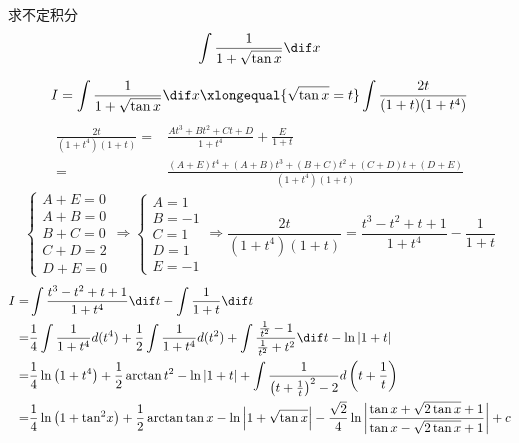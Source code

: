 \documentclass[color=green,titlestyle=hang]{elegantbook}%
\begin{document}
\begin{exercise}求不定积分\[\int {\frac{1}{{1 + \sqrt {\tan x} }}} \dif x\]
\end{exercise}\begin{Solution}
\[ I = \int {\frac{1}{{1 + \sqrt {\tan x} }}} \dif x\xlongequal{\sqrt {\tan x}  = t}\int\frac{2t}{(1+t)(1+t^4)}\]
\begin{align*}
\frac{{2t}}{{\left( {1 + {t^4}} \right)\left( {1 + t} \right)}}
=& \frac{{A{t^3} + B{t^2} + Ct + D}}{{1 + {t^4}}} + \frac{E}{{1 + t}} \\
=& \frac{{\left( {A + E} \right){t^4} + \left( {A + B} \right){t^3} + \left( {B + C} \right){t^2} + \left( {C + D} \right)t + \left( {D + E} \right)}}{{\left( {1 + {t^4}} \right)\left( {1 + t} \right)}}\end{align*}
\[\begin{cases}
A + E = 0\\A + B = 0\\B + C = 0\\C + D = 2\\D + E = 0
\end{cases}  \Longrightarrow \begin{cases}
A = 1\\B =  - 1\\C = 1\\D = 1\\E =  - 1
\end{cases} \Longrightarrow \frac{{2t}}{{\left( {1 + {t^4}} \right)\left( {1 + t} \right)}} = \frac{{{t^3} - {t^2} + t + 1}}{{1 + {t^4}}} - \frac{1}{{1 + t}}\]
\begin{align*}
I = &\int {\frac{{{t^3} - {t^2} + t + 1}}{{1 + {t^4}}}} \dif t - \int {\frac{1}{{1 + t}}} \dif t \\
= &\frac{1}{4}\int {\frac{1}{{1 + {t^4}}}} d({t^4}) + \frac{1}{2}\int {\frac{1}{{1 + {t^4}}}} d(t^2) + \int {\frac{{\frac{1}{{{t^2}}} - 1}}{{\frac{1}{{{t^2}}} + {t^2}}}\dif t}  - \ln \left| {1 + t} \right|\\
=& \frac{1}{4}\ln \left( {1 + {t^4}} \right) + \frac{1}{2}\arctan {t^2} - \ln \left| {1 + t} \right| + \int {\frac{1}{{{{\left( {t + \frac{1}{t}} \right)}^2} - 2}}d\left( {t + \frac{1}{t}} \right)} \\
=& \frac{1}{4}\ln \left( {1 + {{\tan }^2}x} \right) + \frac{1}{2}\arctan \tan x - \ln \left| {1 + \sqrt {\tan x} } \right| - \frac{{\sqrt 2 }}{4}\ln \left| {\frac{{\tan x + \sqrt {2\tan x}  + 1}}{{\tan x - \sqrt {2\tan x}  + 1}}} \right| + c
\end{align*}	
\end{Solution}
\end{document}
